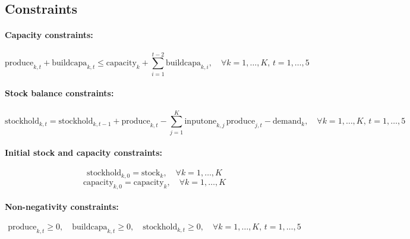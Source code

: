 \documentclass{article}
\begin{document}
\subsection*{Constraints}

\paragraph{Capacity constraints:}
\[
\text{produce}_{k,t} + \text{buildcapa}_{k,t} \leq \text{capacity}_k + \sum_{i=1}^{t-2} \text{buildcapa}_{k,i}, \quad \forall k = 1,\ldots,K, \, t = 1,\ldots,5
\]

\paragraph{Stock balance constraints:}
\[
\text{stockhold}_{k,t} = \text{stockhold}_{k,t-1} + \text{produce}_{k,t} - \sum_{j=1}^{K} \text{inputone}_{k,j} \, \text{produce}_{j,t} - \text{demand}_k, \quad \forall k = 1,\ldots,K, \, t = 1,\ldots,5
\]

\paragraph{Initial stock and capacity constraints:}
\[
\text{stockhold}_{k,0} = \text{stock}_k, \quad \forall k = 1,\ldots,K
\]
\[
\text{capacity}_{k,0} = \text{capacity}_k, \quad \forall k = 1,\ldots,K
\]

\paragraph{Non-negativity constraints:}
\[
\text{produce}_{k,t} \geq 0, \quad \text{buildcapa}_{k,t} \geq 0, \quad \text{stockhold}_{k,t} \geq 0, \quad \forall k = 1,\ldots,K, \, t = 1,\ldots,5
\]
\end{document}
